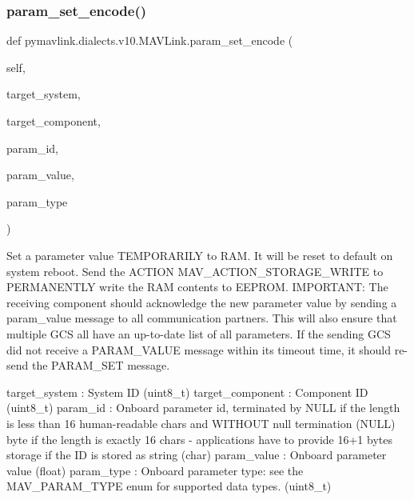 \begin{DoxyVerb}
\begin{DoxyVerb}
\begin{DoxyVerb}
\begin{DoxyVerb}
\subsubsection{\texorpdfstring{param\+\_\+set\+\_\+encode()}{param\_set\_encode()}}
{\footnotesize\ttfamily def pymavlink.\+dialects.\+v10.\+M\+A\+V\+Link.\+param\+\_\+set\+\_\+encode (\begin{DoxyParamCaption}\item[{}]{self,  }\item[{}]{target\+\_\+system,  }\item[{}]{target\+\_\+component,  }\item[{}]{param\+\_\+id,  }\item[{}]{param\+\_\+value,  }\item[{}]{param\+\_\+type }\end{DoxyParamCaption})}

\begin{DoxyVerb}Set a parameter value TEMPORARILY to RAM. It will be reset to default
on system reboot. Send the ACTION
MAV_ACTION_STORAGE_WRITE to PERMANENTLY write the RAM
contents to EEPROM. IMPORTANT: The receiving component
should acknowledge the new parameter value by sending
a param_value message to all communication partners.
This will also ensure that multiple GCS all have an
up-to-date list of all parameters. If the sending GCS
did not receive a PARAM_VALUE message within its
timeout time, it should re-send the PARAM_SET message.

target_system             : System ID (uint8_t)
target_component          : Component ID (uint8_t)
param_id                  : Onboard parameter id, terminated by NULL if the length is less than 16 human-readable chars and WITHOUT null termination (NULL) byte if the length is exactly 16 chars - applications have to provide 16+1 bytes storage if the ID is stored as string (char)
param_value               : Onboard parameter value (float)
param_type                : Onboard parameter type: see the MAV_PARAM_TYPE enum for supported data types. (uint8_t)\end{DoxyVerb}
 \mbox{\label{classpymavlink_1_1dialects_1_1v10_1_1MAVLink_a68ef1752d9707f3eb7a60c4bc5583086}} 

\end{DoxyVerb}
\end{DoxyVerb}
\end{DoxyVerb}
\end{DoxyVerb}
